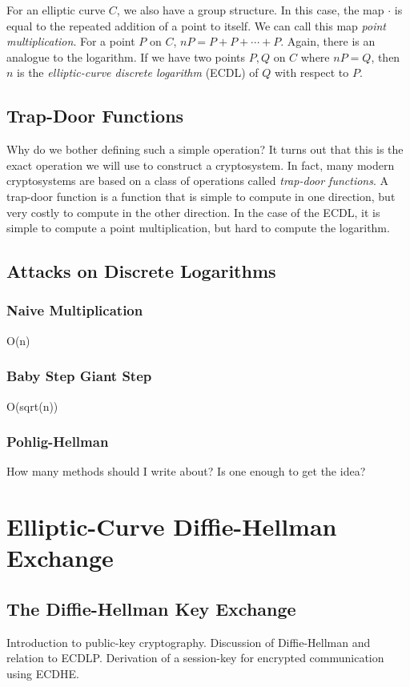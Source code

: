 \documentclass{article}
\begin{document}
For an elliptic curve $C$, we also have a group structure. 
In this case, the map $\cdot$ is equal to the repeated addition of a point to itself. 
We can call this map \textit{point multiplication}.
For a point $P$ on $C$, $nP = P + P + \cdots + P$.
Again, there is an analogue to the logarithm.
If we have two points $P,Q$ on $C$ where $nP = Q$, then $n$ is the \textit{elliptic-curve discrete logarithm} (ECDL) of $Q$ with respect to $P$.

\subsection{Trap-Door Functions}
Why do we bother defining such a simple operation?
It turns out that this is the exact operation we will use to construct a cryptosystem.
In fact, many modern cryptosystems are based on a class of operations called \textit{trap-door functions}.
A trap-door function is a function that is simple to compute in one direction, but very costly to compute in the other direction.
In the case of the ECDL, it is simple to compute a point multiplication, but hard to compute the logarithm.

\subsection{Attacks on Discrete Logarithms}

\subsubsection{Naive Multiplication}
O(n)

\subsubsection{Baby Step Giant Step}
O(sqrt(n))

\subsubsection{Pohlig-Hellman}
How many methods should I write about? Is one enough to get the idea?

\clearpage

\section{Elliptic-Curve Diffie-Hellman Exchange}

\subsection{The Diffie-Hellman Key Exchange}
Introduction to public-key cryptography.
Discussion of Diffie-Hellman and relation to ECDLP.
Derivation of a session-key for encrypted communication using ECDHE.
\end{document}
